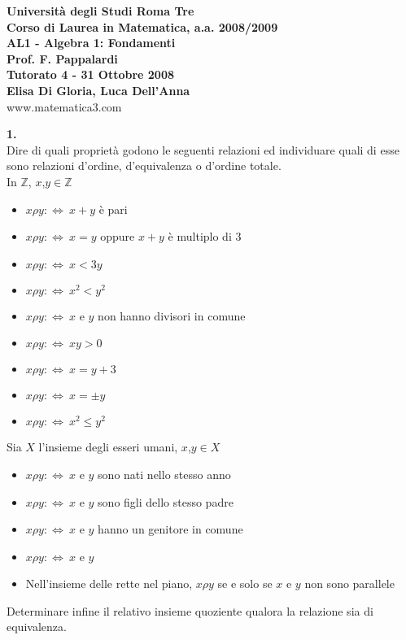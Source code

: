 \documentclass[italian,a4paper,11pt]
{article}
\newcommand{\Z}{\mathbb Z}
\newcommand{\sse}{\Leftrightarrow}
\begin{document}
\begin{center}


\textbf{Universit\`a degli Studi Roma Tre}\\

\textbf{Corso di Laurea in Matematica, a.a. 2008/2009}\\

\textbf{AL1 - Algebra 1: Fondamenti}\\

\textbf{Prof. F. Pappalardi}\\

\textbf{Tutorato 4 - 31 Ottobre 2008}\\

\textbf{Elisa Di Gloria, Luca Dell'Anna}\\

www.matematica3.com\\
\end{center}



\vspace{1cm}




\noindent
\begin{Ex}\textbf{ 1.}\\
Dire di quali propriet\`a godono le seguenti relazioni ed individuare quali di esse sono relazioni d'ordine, d'equivalenza o d'ordine totale.\\
In $\Z$, $x$,$y \in \Z$
\begin{itemize}
	\item $x\rho y :\sse \  x+y$ \`e pari
	\item $x\rho y :\sse \ x=y$ oppure $x+y$ \`e multiplo di 3
	\item $x\rho y :\sse \ x < 3y$
	\item $x\rho y :\sse \ x^2 < y^2$
	\item $x\rho y :\sse \ x$ e $y$ non hanno divisori in comune
	\item $x\rho y :\sse \ xy>0$
	\item $x\rho y :\sse \ x=y+3$
	\item $x\rho y :\sse \ x=\pm y$
	\item $x\rho y :\sse \ x^2 \le y^2$
\end{itemize}
Sia $X$ l'insieme degli esseri umani, $x$,$y \in X$ 
\begin{itemize}
	\item $x \rho y :\sse \ x$ e $y$ sono nati nello stesso anno
  \item $x \rho y :\sse \ x$ e $y$ sono figli dello stesso padre
	\item $x \rho y :\sse \ x$ e $y$ hanno un genitore in comune
	\item $x \rho y :\sse \ x$ e $y$ 
	\item Nell'insieme delle rette nel piano, $x \rho y$ se e solo se $x$ e $y$ non sono parallele
\end{itemize}
Determinare infine il relativo insieme quoziente qualora la relazione sia di equivalenza.
\end{Ex}
\end{document}

